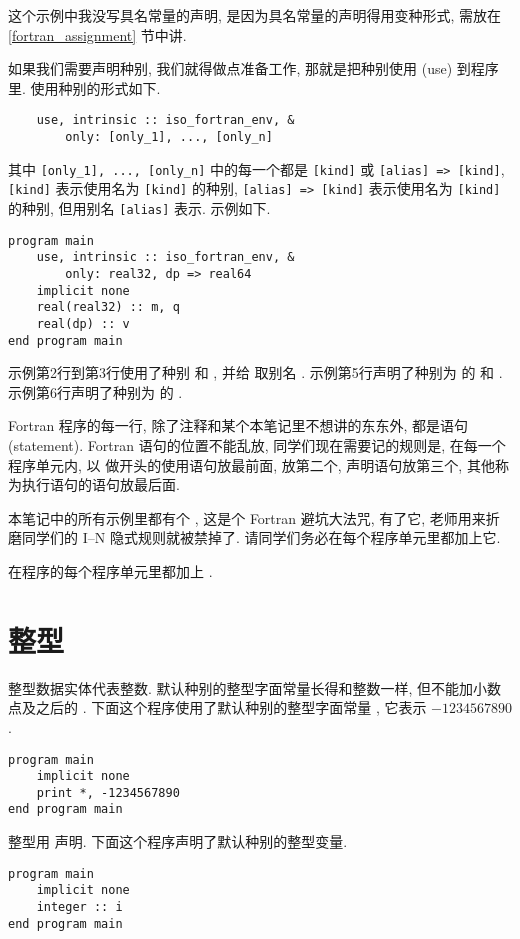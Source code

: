 这个示例中我没写具名常量的声明, 是因为具名常量的声明得用变种形式, 需放在 \ref{fortran_assignment} 节中讲.

如果我们需要声明种别, 我们就得做点准备工作, 那就是把种别使用 (use) 到程序里. 使用种别的形式如下.
\begin{verbatim}
    use, intrinsic :: iso_fortran_env, &
        only: [only_1], ..., [only_n]
\end{verbatim}
其中 \texttt{[only\_{}1], ..., [only\_{}n]} 中的每一个都是 \texttt{[kind]} 或 \texttt{[alias] => [kind]}, \texttt{[kind]} 表示使用名为 \texttt{[kind]} 的种别, \texttt{[alias] => [kind]} 表示使用名为 \texttt{[kind]} 的种别, 但用别名 \texttt{[alias]} 表示. 示例如下.
\begin{lstlisting}
program main
    use, intrinsic :: iso_fortran_env, &
        only: real32, dp => real64
    implicit none
    real(real32) :: m, q
    real(dp) :: v
end program main
\end{lstlisting}
示例第2行到第3行使用了种别  和 , 并给  取别名 . 示例第5行声明了种别为  的  和 . 示例第6行声明了种别为  的 .

Fortran 程序的每一行, 除了注释和某个本笔记里不想讲的东东外, 都是语句 (statement). Fortran 语句的位置不能乱放, 同学们现在需要记的规则是, 在每一个程序单元内, 以  做开头的使用语句放最前面,  放第二个, 声明语句放第三个, 其他称为执行语句的语句放最后面.

本笔记中的所有示例里都有个 , 这是个 Fortran 避坑大法咒, 有了它, 老师用来折磨同学们的 I--N 隐式规则就被禁掉了. 请同学们务必在每个程序单元里都加上它.
\begin{convention}
    在程序的每个程序单元里都加上 .
\end{convention}

\section{整型}

整型数据实体代表整数. 默认种别的整型字面常量长得和整数一样, 但不能加小数点及之后的 . 下面这个程序使用了默认种别的整型字面常量 , 它表示 $-1234567890$.
\begin{lstlisting}
program main
    implicit none
    print *, -1234567890
end program main
\end{lstlisting}

整型用  声明. 下面这个程序声明了默认种别的整型变量.
\begin{lstlisting}
program main
    implicit none
    integer :: i
end program main
\end{lstlisting}

